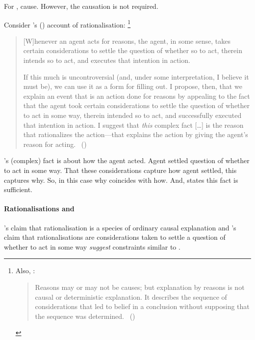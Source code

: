 \begin{note}
  For \citeauthor{Davidson:1963aa}, cause.
  However, the causation is not required.

  Consider \citeauthor{Hieronymi:2011aa}'s (\citeyear{Hieronymi:2011aa}) account of rationalisation:%
  \footnote{
    Also, \citeauthor{Harman:1973ww}:
    \begin{quote}
    Reasons may or may not be causes; but explanation by reasons is not causal or deterministic explanation.
    It describes the sequence of considerations that led to belief in a conclusion without supposing that the sequence was determined.%
    \mbox{ }\hfill\mbox{(\citeyear[52]{Harman:1973ww})}
  \end{quote}
  }

  \begin{quote}
    [W]henever an agent acts for reasons, the agent, in some sense, takes certain considerations to settle the question of whether so to act, therein intends so to act, and executes that intention in action.

    If this much is uncontroversial (and, under some interpretation, I believe it must be), we can use it as a form for filling out.
    I propose, then, that we explain an event that is an action done for reasons by appealing to the fact that the agent took certain considerations to settle the question of whether to act in some way, therein intended so to act, and successfully executed that intention in action.
    I suggest that \emph{this} complex fact [\dots] is the reason that rationalizes the action---that explains the action by giving the agent's reason for acting.%
    \mbox{ }\hfill\mbox{(\citeyear[421]{Hieronymi:2011aa})}
  \end{quote}

  \citeauthor{Hieronymi:2011aa}'s (complex) fact is about how the agent acted.
  Agent settled question of whether to act in some way.
  That these considerations capture how agent settled, this captures why.
  So, in this case why coincides with how.
  And,  states this fact is sufficient.
\end{note}

\paragraph*{Rationalisations and }

\begin{note}
  \citeauthor{Davidson:1963aa}'s claim that rationalisation is a species of ordinary causal explanation and \citeauthor{Hieronymi:2011aa}'s claim that rationalisations are considerations taken to settle a question of whether to act in some way \emph{suggest} constraints similar to \issueInclusion{}.
\end{note}

